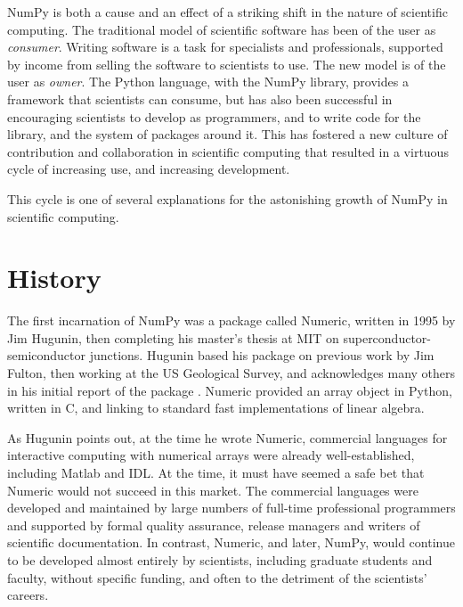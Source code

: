 
NumPy is both a cause and an effect of a striking shift in the nature of
scientific computing.  The traditional model of scientific software has been of
the user as {\it consumer}.  Writing software is a task for specialists and
professionals, supported by income from selling the software to scientists to
use.  The new model is of the user as {\it owner}.  The Python language, with
the NumPy library, provides a framework that scientists can consume, but has
also been successful in encouraging scientists to develop as programmers, and
to write code for the library, and the system of packages around it.  This has
fostered a new culture of contribution and collaboration in scientific
computing that resulted in a virtuous cycle of increasing use, and increasing
development.

This cycle is one of several explanations for the astonishing growth of NumPy
in scientific computing.

\section*{History}

The first incarnation of NumPy was a package called Numeric, written in 1995
by Jim Hugunin, then completing his master's thesis at MIT on
superconductor-semiconductor junctions.  Hugunin based his package on previous
work by Jim Fulton, then working at the US Geological Survey, and acknowledges
many others in his initial report of the package \cite{Hugunin-whitepaper}.
Numeric provided an array object in Python, written in C, and linking to
standard fast implementations of linear algebra.

As Hugunin points out, at the time he wrote Numeric, commercial languages for
interactive computing with numerical arrays were already well-established,
including Matlab and IDL.  At the time, it must have seemed a safe bet that
Numeric would not succeed in this market.  The commercial languages were
developed and maintained by large numbers of full-time professional programmers
and supported by formal quality assurance, release managers and writers of
scientific documentation.  In contrast, Numeric, and later, NumPy, would
continue to be developed almost entirely by scientists, including graduate
students and faculty, without specific funding, and often to the detriment of
the scientists' careers.

